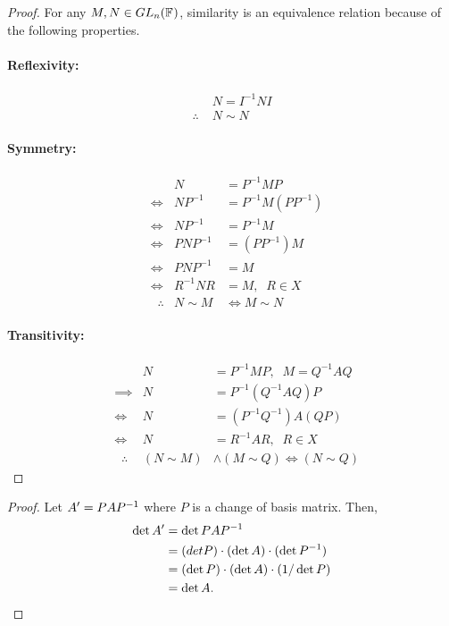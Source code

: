 \documentclass[../MathsNotesBase.tex]{subfiles}
\begin{document}
{		\bigskip
		\begin{proof}
			For any ${ M,N \in GL_n(\mathbb{F}^{}) }$, similarity is an equivalence relation because of the following properties.
			
			\paragraph{\small{Reflexivity:}}
			\begin{align*}
				& N = I^{-1}NI \\
				\therefore \; & N \sim N
			\end{align*}
			
			\paragraph{\small{Symmetry:}}
			\begin{align*}
				& & N &= P^{-1}MP \\
				&\iff & NP^{-1} &= P^{-1}M(PP^{-1}) \\
				&\iff & NP^{-1} &= P^{-1}M \\
				&\iff & PNP^{-1} &= (PP^{-1})M \\
				&\iff & PNP^{-1} &= M \\
				&\iff & R^{-1}NR &= M,\;\; R \in X\\
				&\;\;\therefore & N \sim M &\iff M \sim N
			\end{align*}
			
			\paragraph{\small{Transitivity:}}
			\begin{align*}
				& & N &= P^{-1}MP,\;\; M = Q^{-1}AQ \\
				&\implies & N &= P^{-1}(Q^{-1}AQ)P \\
				&\iff & N &= (P^{-1}Q^{-1})A(QP) \\
				&\iff & N &= R^{-1}AR,\;\; R \in X\\
				&\;\;\therefore & (N \sim M) & \wedge (M \sim Q) \iff (N \sim Q)
			\end{align*}
		\end{proof}
		
		\bigskip
		\begin{proof}
			Let ${ A' = PA{P}^{-1} }$ where $P$ is a change of basis matrix. Then,
			\begin{align*}
				\det{A'} &= \det{PA{P}^{-1}}\\
				&= (det{P}) \cdot (\det{A}) \cdot (\det{{P}^{-1}})\\
				&= (\det{P}) \cdot (\det{A}) \cdot (1/\det{P})\\
				&= \det{A}. \qedhere
			\end{align*}
		\end{proof}
	
	}
\end{document}

